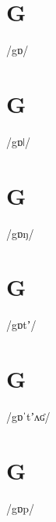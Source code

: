 \documentclass[10pt,a4paper,twoside]{book}
\begin{document}
\section*{G}

\begin{multicols}{3}
 {/gɒ/} {}
\end{multicols}

\section*{G}

\begin{multicols}{3}
 {/gɒǀ/} {}
\end{multicols}

\section*{G}

\begin{multicols}{3}
 {/gɒŋ/} {}
\end{multicols}

\section*{G}

\begin{multicols}{3}
 {/gɒtʼ/} {}
\end{multicols}

\section*{G}

\begin{multicols}{3}
 {/gɒˈtʼʌʛ/} {}
\end{multicols}

\section*{G}

\begin{multicols}{3}
 {/gɒp/} {}
\end{multicols}
\end{document}
